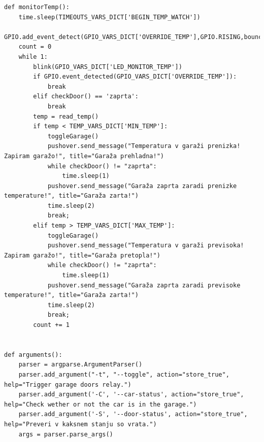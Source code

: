 \documentclass[11pt]{article}
\begin{document}
\begin{verbatim}
def monitorTemp():
    time.sleep(TIMEOUTS_VARS_DICT['BEGIN_TEMP_WATCH'])
    GPIO.add_event_detect(GPIO_VARS_DICT['OVERRIDE_TEMP'],GPIO.RISING,bouncetime=300)
    count = 0
    while 1:
        blink(GPIO_VARS_DICT['LED_MONITOR_TEMP'])
        if GPIO.event_detected(GPIO_VARS_DICT['OVERRIDE_TEMP']):
            break
        elif checkDoor() == 'zaprta':
            break
        temp = read_temp()
        if temp < TEMP_VARS_DICT['MIN_TEMP']:
            toggleGarage()
            pushover.send_message("Temperatura v garaži prenizka! Zapiram garažo!", title="Garaža prehladna!")
            while checkDoor() != "zaprta":
                time.sleep(1)
            pushover.send_message("Garaža zaprta zaradi prenizke temperature!", title="Garaža zarta!")
            time.sleep(2)
            break;
        elif temp > TEMP_VARS_DICT['MAX_TEMP']:
            toggleGarage()
            pushover.send_message("Temperatura v garaži previsoka! Zapiram garažo!", title="Garaža pretopla!")
            while checkDoor() != "zaprta":
                time.sleep(1)
            pushover.send_message("Garaža zaprta zaradi previsoke temperature!", title="Garaža zarta!")
            time.sleep(2)
            break;
        count += 1


def arguments():
    parser = argparse.ArgumentParser()
    parser.add_argument("-t", "--toggle", action="store_true", help="Trigger garage doors relay.")
    parser.add_argument('-C', '--car-status', action="store_true", help="Check wether or not the car is in the garage.")
    parser.add_argument('-S', '--door-status', action="store_true", help="Preveri v kaksnem stanju so vrata.")
    args = parser.parse_args()


\end{verbatim}
\end{document}
